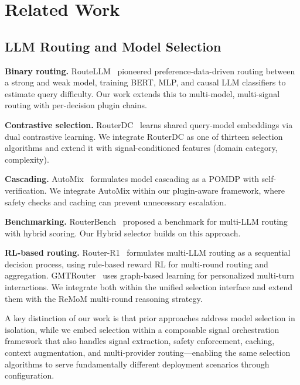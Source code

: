 
\section{Related Work}
\label{sec:related_work}

\subsection{LLM Routing and Model Selection}

\noindent\textbf{Binary routing.}
RouteLLM~\cite{ong2024routellm} pioneered preference-data-driven routing between a strong and weak model, training BERT, MLP, and causal LLM classifiers to estimate query difficulty.
Our work extends this to multi-model, multi-signal routing with per-decision plugin chains.

\noindent\textbf{Contrastive selection.}
RouterDC~\cite{chen2024routerdc} learns shared query-model embeddings via dual contrastive learning.
We integrate RouterDC as one of thirteen selection algorithms and extend it with signal-conditioned features (domain category, complexity).

\noindent\textbf{Cascading.}
AutoMix~\cite{aggarwal2023automix} formulates model cascading as a POMDP with self-verification.
We integrate AutoMix within our plugin-aware framework, where safety checks and caching can prevent unnecessary escalation.

\noindent\textbf{Benchmarking.}
RouterBench~\cite{hu2024routerbench} proposed a benchmark for multi-LLM routing with hybrid scoring.
Our Hybrid selector builds on this approach.

\noindent\textbf{RL-based routing.}
Router-R1~\cite{zhang2025routerr1} formulates multi-LLM routing as a sequential decision process, using rule-based reward RL for multi-round routing and aggregation.
GMTRouter~\cite{xie2025gmtrouter} uses graph-based learning for personalized multi-turn interactions.
We integrate both within the unified selection interface and extend them with the ReMoM multi-round reasoning strategy.

A key distinction of our work is that prior approaches address model selection in isolation, while we embed selection within a composable signal orchestration framework that also handles signal extraction, safety enforcement, caching, context augmentation, and multi-provider routing---enabling the same selection algorithms to serve fundamentally different deployment scenarios through configuration.

